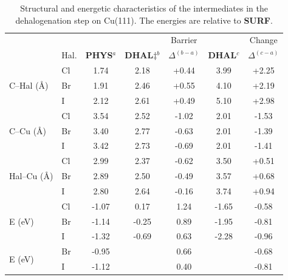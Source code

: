 \documentclass[journal=jpclcd,layout=traditional,manuscript=letter]{achemso} %
\begin{document}
\begin{table}
\centering
\scriptsize
\caption{Structural and energetic characteristics of the intermediates in the dehalogenation step on Cu(111). The energies are relative to \textbf{SURF}.}
\label{table:bondlength}
\begin{tabular}{ llccccc  }
 \hline
 \hline
  & & & & Barrier & & Change \\
  & Hal. & \textbf{PHYS}$^{a}$ & \textbf{DHAL$\ddagger$}$^{b}$ & $\Delta^{(b-a)}$ & \textbf{DHAL}$^{c}$ & $\Delta^{(c-a)}$ \\ 
 \hline 
 \multirow{3}{*}{C--Hal (\si{\angstrom})} & Cl & 1.74 & 2.18 & +0.44 & 3.99 & +2.25 \\ 
 & Br & 1.91 & 2.46 & +0.55 & 4.10 &+2.19 \\ 
 & I & 2.12 & 2.61 & +0.49 & 5.10 &+2.98 \\ 
 \hline
 \multirow{3}{*}{C--Cu (\si{\angstrom}) } & Cl & 3.54 & 2.52 & -1.02 & 2.01 & -1.53 \\ 
 & Br & 3.40 & 2.77 & -0.63 & 2.01 & -1.39 \\ 
 & I &3.42 & 2.73 &-0.69 & 2.01 & -1.41 \\ 
 \hline
 \multirow{3}{*}{Hal--Cu (\si{\angstrom}) } & Cl & 2.99 & 2.37 & -0.62 & 3.50 & +0.51 \\ 
 & Br & 2.89 & 2.50 & -0.49 & 3.57 & +0.68 \\ 
 & I &2.80 & 2.64 &-0.16 & 3.74 & +0.94 \\ 
 \hline
 \multirow{3}{*}{E (\si{\electronvolt}) } & Cl & -1.07 & 0.17 & 1.24 &-1.65 & -0.58 \\ 
 & Br &-1.14 &-0.25 & 0.89 & -1.95& -0.81 \\ 
 & I  & -1.32 & -0.69 & 0.63 & -2.28& -0.96 \\ 
 \hline
 \multirow{2}{*}{E (\si{\electronvolt})~\cite{jacs2013}} & Br &-0.95 & & 0.66 & & -0.68 \\ 
 & I & -1.12 & & 0.40 & & -0.81 \\ 
 \hline
 \hline
\end{tabular}
\end{table}
\end{document}
